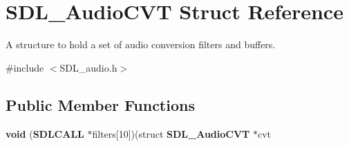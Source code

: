 \section{S\+D\+L\+\_\+\+Audio\+C\+V\+T Struct Reference}
\label{struct_s_d_l___audio_c_v_t}


A structure to hold a set of audio conversion filters and buffers.  




{\ttfamily \#include $<$S\+D\+L\+\_\+audio.\+h$>$}

\subsection*{Public Member Functions}
\begin{DoxyCompactItemize}
\item 
{\bfseries void} ({\bf S\+D\+L\+C\+A\+L\+L} $\ast$filters[10])(struct {\bf S\+D\+L\+\_\+\+Audio\+C\+V\+T} $\ast$cvt\label{struct_s_d_l___audio_c_v_t_a289a571421d05e416dd585c6f890a75b}

\end{DoxyCompactItemize}
